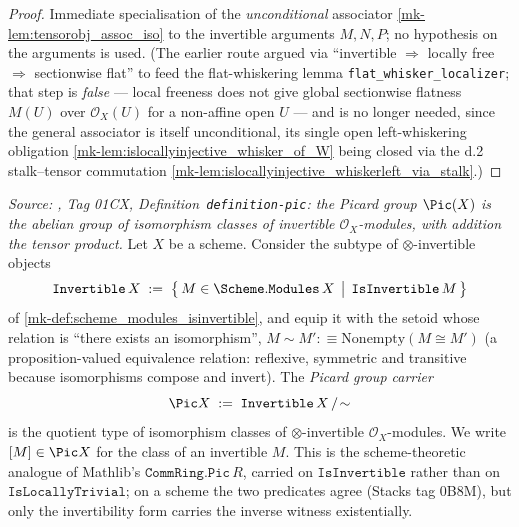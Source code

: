 \begin{proof}
  \leanok
  Immediate specialisation of the \emph{unconditional} associator
  \ref{mk-lem:tensorobj_assoc_iso} to the invertible arguments \(M, N, P\); no
  hypothesis on the arguments is used. (The earlier route argued via ``invertible
  \(\Rightarrow\) locally free \(\Rightarrow\) sectionwise flat'' to feed the
  flat-whiskering lemma \texttt{flat\_whisker\_localizer}; that step is \emph{false}
  --- local freeness does not give global sectionwise flatness \(M(U)\) over
  \(\mathcal{O}_X(U)\) for a non-affine open \(U\) --- and is no longer needed, since
  the general associator is itself unconditional, its single open left-whiskering
  obligation \ref{mk-lem:islocallyinjective_whisker_of_W} being closed via the d.2
  stalk--tensor commutation \ref{mk-lem:islocallyinjective_whiskerleft_via_stalk}.)
\end{proof}

\begin{definition}\label{mk-def:pic_carrier}

  \textit{Source: \cite{stacks-project}, Tag 01CX, Definition~\texttt{definition-pic}:
  the Picard group \(\Pic(X)\) is the abelian group of isomorphism classes of
  invertible \(\mathcal{O}_X\)-modules, with addition the tensor product.}
  Let \(X\) be a scheme. Consider the subtype of \(\otimes\)-invertible objects
  \[
    \mathtt{Invertible}\,X
    \;:=\;
    \bigl\{\, M \in \Scheme.\mathtt{Modules}\,X
              \,\bigm|\, \mathtt{IsInvertible}\,M \,\bigr\}
  \]
  of \ref{mk-def:scheme_modules_isinvertible}, and equip it with the setoid whose
  relation is ``there exists an isomorphism'',
  \(M \sim M' :\equiv \mathrm{Nonempty}(M \cong M')\) (a proposition-valued
  equivalence relation: reflexive, symmetric and transitive because isomorphisms
  compose and invert). The \emph{Picard group carrier}
  \[
    \Pic X \;:=\; \mathtt{Invertible}\,X \,/\!\sim
  \]
  is the quotient type of isomorphism classes of \(\otimes\)-invertible
  \(\mathcal{O}_X\)-modules. We write \([M] \in \Pic X\) for the class of an
  invertible \(M\). This is the scheme-theoretic analogue of Mathlib's
  \(\mathtt{CommRing.Pic}\,R\), carried on \(\mathtt{IsInvertible}\) rather than on
  \(\mathtt{IsLocallyTrivial}\); on a scheme the two predicates agree (Stacks tag
  0B8M), but only the invertibility form carries the inverse witness existentially.
\end{definition}

